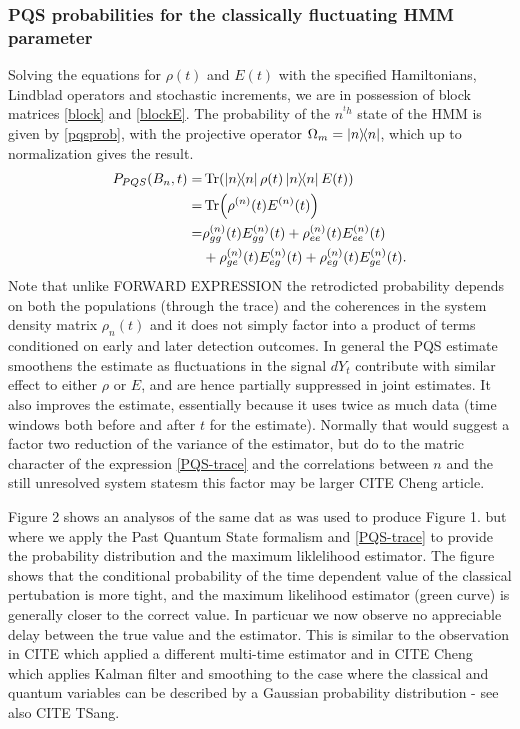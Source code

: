 \documentclass[aps,pra,twocolumn,groupedaddress,showpacs]{revtex4}
\begin{document}
\subsubsection{PQS probabilities for the classically fluctuating HMM parameter}

Solving the equations for $\rho(t)$ and $E(t)$ with the specified Hamiltonians, Lindblad operators and stochastic increments, we are in possession of block matrices \eqref{block} and \eqref{blockE}. The probability of the $n^{^th}$ state of the HMM is given by \eqref{pqsprob}, with the projective operator
$\Omega_m = \dyad{n}{n}$, which up to normalization gives the result.    
\begin{align}
P_{PQS}(B_n, t) =& \Tr(\dyad{n}{n} \rho(t) \dyad{n}{n} E(t)) \nonumber\\
=& \Tr(\rho^{(n)}(t) E^{(n)}(t))  \nonumber \\
=& \rho^{(n)}_{gg}(t)E^{(n)}_{gg}(t) + \rho^{(n)}_{ee}(t)E^{(n)}_{ee}(t) \nonumber \\
&+ \rho^{(n)}_{ge}(t)E^{(n)}_{eg}(t) + \rho^{(n)}_{eg}(t)E^{(n)}_{ge}(t) \label{PQS-trace}.
\end{align}
Note that unlike FORWARD EXPRESSION the retrodicted probability depends on both the populations (through the trace) and the coherences in the system density matrix $\rho_n(t)$ and it does not simply factor into a product of terms conditioned on early and later detection outcomes. In general the PQS estimate smoothens the estimate as fluctuations in the signal $dY_t$ contribute with similar effect to either $\rho$ or $E$, and are hence partially suppressed in joint estimates. It also improves the estimate, essentially because it uses twice as much data (time windows both before and after $t$ for the estimate). Normally that would suggest a factor two reduction of the variance of the estimator, but do to the matric character of the expression \eqref{PQS-trace} and the correlations between $n$ and the still unresolved system statesm this factor may be larger CITE Cheng article.   


Figure 2 shows an analysos of the same dat as was used to produce Figure 1. but where we apply the Past Quantum State formalism and \eqref{PQS-trace} to provide the probability distribution and the maximum liklelihood estimator. The figure shows that the conditional probability of the time dependent  value of the classical pertubation is more tight, and the maximum likelihood estimator (green curve) is generally closer to the correct value. In particuar we now observe no appreciable delay between the true value and the estimator. This is similar to the observation in CITE which applied a different multi-time estimator and in CITE Cheng which applies Kalman filter and smoothing to the case where the classical and quantum variables can be described by a Gaussian probability distribution - see also CITE TSang.
\end{document}
